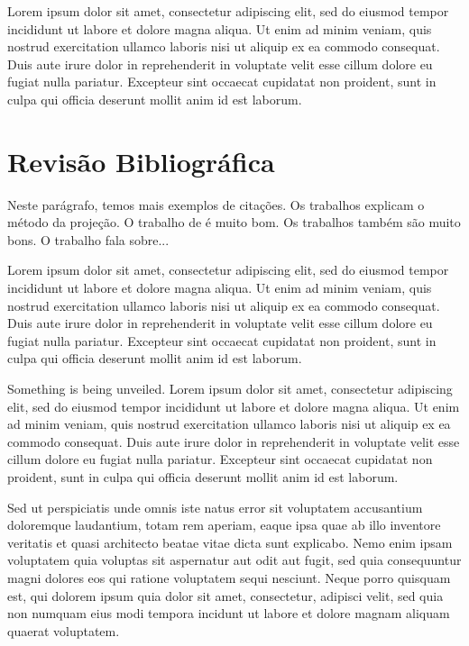 Lorem ipsum dolor sit amet, consectetur adipiscing elit, sed do eiusmod tempor incididunt ut labore et dolore magna aliqua. Ut enim ad minim veniam, quis nostrud exercitation ullamco laboris nisi ut aliquip ex ea commodo consequat. Duis aute irure dolor in reprehenderit in voluptate velit esse cillum dolore eu fugiat nulla pariatur. Excepteur sint occaecat cupidatat non proident, sunt in culpa qui officia deserunt mollit anim id est laborum.




\section{Revisão Bibliográfica}



Neste parágrafo, temos mais exemplos de citações. Os trabalhos \cite{Guermond:2006,Guermond:2003} explicam o método da projeção. O trabalho de  é muito bom. Os trabalhos \cite{Munz:2003,Thomadakis:1996} também são muito bons. O trabalho \cite{cotta:1996} fala sobre...

Lorem ipsum dolor sit amet, consectetur adipiscing elit, sed do eiusmod tempor incididunt ut labore et dolore magna aliqua. Ut enim ad minim veniam, quis nostrud exercitation ullamco laboris nisi ut aliquip ex ea commodo consequat. Duis aute irure dolor in reprehenderit in voluptate velit esse cillum dolore eu fugiat nulla pariatur. Excepteur sint occaecat cupidatat non proident, sunt in culpa qui officia deserunt mollit anim id est laborum.

Something is being unveiled. Lorem ipsum dolor sit amet, consectetur adipiscing elit, sed do eiusmod tempor incididunt ut labore et dolore magna aliqua. Ut enim ad minim veniam, quis nostrud exercitation ullamco laboris nisi ut aliquip ex ea commodo consequat. Duis aute irure dolor in reprehenderit in voluptate velit esse cillum dolore eu fugiat nulla pariatur. Excepteur sint occaecat cupidatat non proident, sunt in culpa qui officia deserunt mollit anim id est laborum.

Sed ut perspiciatis unde omnis iste natus error sit voluptatem accusantium doloremque laudantium, totam rem aperiam, eaque ipsa quae ab illo inventore veritatis et quasi architecto beatae vitae dicta sunt explicabo. Nemo enim ipsam voluptatem quia voluptas sit aspernatur aut odit aut fugit, sed quia consequuntur magni dolores eos qui ratione voluptatem sequi nesciunt. Neque porro quisquam est, qui dolorem ipsum quia dolor sit amet, consectetur, adipisci velit, sed quia non numquam eius modi tempora incidunt ut labore et dolore magnam aliquam quaerat voluptatem.



